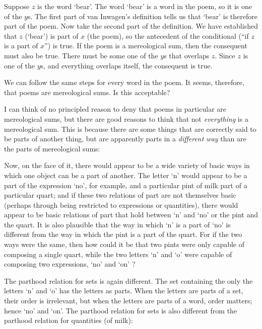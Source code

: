 \documentclass[11pt]{article}
\newenvironment{squote}{%
\begin{spacing}{1}
\begin{list}{}{%
\setlength{\labelwidth}{0pt}%
\rightmargin\leftmargin%
}
\item\relax
}{%
\end{list}%
\end{spacing}
}
\begin{document}
\begin{spacing}{1.5}
Suppose $z$ is the word `bear'.  The word `bear' is a word in the
poem, so it is one of the $y$s.  The first part of van Inwagen's
definition tells us that `bear' is therefore part of the poem.  Now
take the second part of the definition.  We have established that $z$
(`bear') is part of $x$ (the poem), so the antecedent of the
conditional (``if $z$ is a part of $x$'') is true.  If the poem is a
mereological sum, then the consequent must also be true.  There must
be some one of the $y$s that overlaps $z$.  Since $z$ is one of the
$y$s, and everything overlaps itself, the consequent is true.

We can follow the same steps for every word in the poem.  It seems,
therefore, that poems are mereological sums.  Is this acceptable?

I can think of no principled reason to deny that poems in particular
are mereological sums, but there are good reasons to think that not
{\em everything} is a mereological sum.  This is because there are
some things that are correctly said to be parts of another thing, but
are apparently parts in a {\em different way} than are the parts of
mereological sums:

\begin{squote}
Now, on the face of it, there would appear to be a wide variety of
basic ways in which one object can be a part of another.  The letter
`n' would appear to be a part of the expression `no', for example, and
a particular pint of milk part of a particular quart; and if these two
relations of part are not themselves basic (perhaps through being
restricted to expressions or quantities), there would appear to be
basic relations of part that hold between `n' and `no' or the pint and
the quart.  It is also plausible that the way in which `n' is a part
of `no' is different from the way in which the pint is a part of the
quart.  For if the two ways were the same, then how could it be that
two pints were only capable of composing a single quart, while the two
letters `n' and `o' were capable of composing two expressions, `no'
and `on' \citep[562]{fine2010}?
\end{squote}

The parthood relation for sets is again different.  The set containing
the only the letters `n' and `o' has the letters as parts.  When the
letters are parts of a set, their order is irrelevant, but when the
letters are parts of a word, order matters; hence `no' and `on'.  The
parthood relation for sets is also different from the parthood
relation for quantities (of milk):


\end{spacing}
\end{document}
